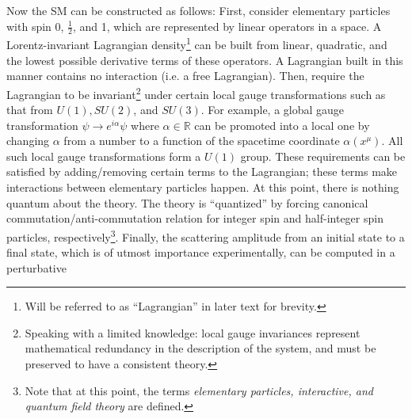 Now the SM can be constructed as follows:
First, consider elementary particles with spin 0, $\frac{1}{2}$, and 1,
which are represented by linear operators in a space.
A Lorentz-invariant Lagrangian density\footnote{
    Will be referred to as ``Lagrangian'' in later text for brevity.
} can be built from
linear, quadratic, and the lowest possible derivative terms of these
operators.
A Lagrangian built in this manner contains no interaction (i.e. a free
Lagrangian).
Then, require the Lagrangian to be invariant\footnote{
    Speaking with a limited knowledge: local gauge invariances represent
    mathematical redundancy in the description of the system,
    and must be preserved to have a consistent theory.
} under certain local gauge transformations
such as that from $U(1), SU(2)$, and $SU(3)$.
For example, a global gauge transformation
$\psi \rightarrow e^{i\alpha} \psi$ where $\alpha \in \mathbb{R}$
can be promoted into a local one by
changing $\alpha$ from a number to a function of the spacetime coordinate
$\alpha(x^\mu)$.
All such local gauge transformations form a $U(1)$ group.
These requirements can be satisfied by adding/removing certain terms to the
Lagrangian;
these terms make interactions between elementary particles happen.
At this point, there is nothing quantum about the theory.
The theory is ``quantized'' by forcing canonical commutation/anti-commutation
relation for integer spin and half-integer spin particles,
respectively\footnote{
    Note that at this point, the terms
    \emph{elementary particles, interactive, and quantum field theory}
    are defined.
}.
Finally, the scattering amplitude from an initial state to a final state,
which is of utmost importance experimentally,
can be computed in a perturbative
